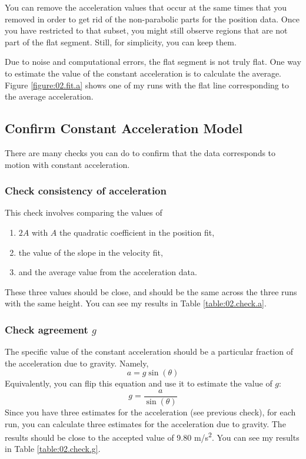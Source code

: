 You can remove the acceleration values that occur at the same times that you removed in order to get rid of the non-parabolic parts for the position data. Once you have restricted to that subset, you might still observe regions that are not part of the flat segment. Still, for simplicity, you can keep them.

Due to noise and computational errors, the flat segment is not truly flat. One way to estimate the value of the constant acceleration is to calculate the average. Figure \ref{figure:02.fit.a} shows one of my runs with the flat line corresponding to the average acceleration. 
%
\subsection{Confirm Constant Acceleration Model}
%
There are many checks you can do to confirm that the data corresponds to motion with constant acceleration.
%
\subsubsection{Check consistency of acceleration}
%
This check involves comparing the values of
\begin{enumerate}
    \item $2A$ with $A$ the quadratic coefficient in the position fit,
    \item the value of the slope in the velocity fit,
    \item and the average value from the acceleration data.
\end{enumerate}
These three values should be close, and should be the same across the three runs with the same height. You can see my results in Table \ref{table:02.check.a}.
%
\subsubsection{Check agreement $g$}
%
The specific value of the constant acceleration should be a particular fraction of the acceleration due to gravity. Namely,
\begin{equation}
    a = g \sin(\theta)
\end{equation}
Equivalently, you can flip this equation and use it to estimate the value of $g$:
\begin{equation}
    g = \frac{a}{\sin(\theta)}
\end{equation}
Since you have three estimates for the acceleration (see previous check), for each run, you can calculate three estimates for the acceleration due to gravity. The results should be close to the accepted value of 9.80 m/s\textsuperscript{2}. You can see my results in Table \ref{table:02.check.g}.
%
